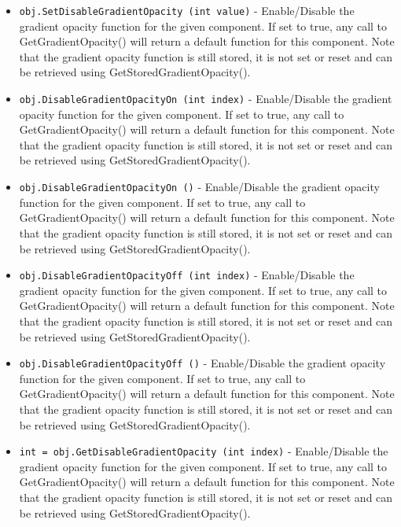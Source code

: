 \begin{itemize}
\item  \verb|obj.SetDisableGradientOpacity (int value)| -  Enable/Disable the gradient opacity function for the given component. 
 If set to true, any call to GetGradientOpacity() will return a default
 function for this component. Note that the gradient opacity function is 
 still stored, it is not set or reset and can be retrieved using 
 GetStoredGradientOpacity().

\item  \verb|obj.DisableGradientOpacityOn (int index)| -  Enable/Disable the gradient opacity function for the given component. 
 If set to true, any call to GetGradientOpacity() will return a default
 function for this component. Note that the gradient opacity function is 
 still stored, it is not set or reset and can be retrieved using 
 GetStoredGradientOpacity().

\item  \verb|obj.DisableGradientOpacityOn ()| -  Enable/Disable the gradient opacity function for the given component. 
 If set to true, any call to GetGradientOpacity() will return a default
 function for this component. Note that the gradient opacity function is 
 still stored, it is not set or reset and can be retrieved using 
 GetStoredGradientOpacity().

\item  \verb|obj.DisableGradientOpacityOff (int index)| -  Enable/Disable the gradient opacity function for the given component. 
 If set to true, any call to GetGradientOpacity() will return a default
 function for this component. Note that the gradient opacity function is 
 still stored, it is not set or reset and can be retrieved using 
 GetStoredGradientOpacity().

\item  \verb|obj.DisableGradientOpacityOff ()| -  Enable/Disable the gradient opacity function for the given component. 
 If set to true, any call to GetGradientOpacity() will return a default
 function for this component. Note that the gradient opacity function is 
 still stored, it is not set or reset and can be retrieved using 
 GetStoredGradientOpacity().

\item  \verb|int = obj.GetDisableGradientOpacity (int index)| -  Enable/Disable the gradient opacity function for the given component. 
 If set to true, any call to GetGradientOpacity() will return a default
 function for this component. Note that the gradient opacity function is 
 still stored, it is not set or reset and can be retrieved using 
 GetStoredGradientOpacity().


\end{itemize}

